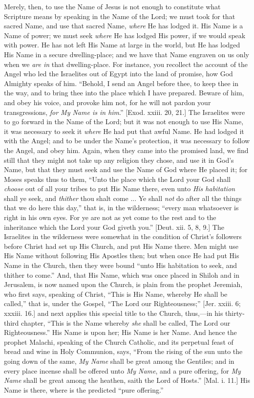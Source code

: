 Merely, then, to use the Name of Jesus is not enough to constitute
what Scripture means by speaking in the Name of the Lord; we must took
for that sacred Name, and use that sacred Name, \emph{where} He has
lodged it. His Name is a Name of power; we must seek \emph{where} He
has lodged His power, if we would speak with power. He has not left
His Name at large in the world, but He has lodged His Name in a secure
dwelling-place; and we have that Name engraven on us only when we \emph{are
in} that dwelling-place. For instance, you recollect the account of
the Angel who led the Israelites out of Egypt into the land of
promise, how God Almighty speaks of him. ``Behold, I send an Angel
before thee, to keep thee in the way, and to bring thee into the place
which I have prepared. Beware of him, and obey his voice, and provoke
him not, for he will not pardon your transgressions, \emph{for My Name is in
him}.'' [Exod. xxiii. 20, 21.] The Israelites were to go forward in
the Name of the Lord; but it was not enough to use His Name, it was
necessary to seek it \emph{where} He had put that awful Name. He had
lodged it with the Angel; and to be under the Name's protection, it
was necessary to follow the Angel, and obey him. Again, when they came
into the promised land, we find still that they might not take up any
religion they chose, and use it in God's Name, but that they must seek
and use the Name of God where He placed it; for Moses speaks thus to
them, ``Unto the place which the Lord your God shall \emph{choose}
out of all your tribes to put His Name there, even unto \emph{His
habitation} shall ye seek, and \emph{thither} thou shalt come ...
Ye shall \emph{not} do after all the things that we do here this
day,'' that is, in the wilderness; ``every man whatsoever is
right in his own eyes. For ye are not as yet come to the rest and to
the inheritance which the Lord your God giveth you.'' [Deut. xii.
5, 8, 9.] The Israelites in the wilderness were somewhat in the
condition of Christ's followers before Christ had set up His Church,
and put His Name there. Men might use His Name without following His
Apostles then; but when once He had put His Name in the Church, then
they were bound ``unto His habitation to seek, and thither to
come.'' And, that His Name, which was once placed in Shiloh and in
Jerusalem, is now named upon the Church, is plain from the prophet
Jeremiah, who first says, speaking of Christ, ``This is His Name,
whereby He shall be called,'' that is, under the Gospel, ``The
Lord our Righteousness;'' [Jer. xxiii. 6; xxxiii. 16.] and next
applies this special title to the Church, thus,—in his thirty-third
chapter, ``This is the Name whereby \emph{she} shall be called,
The Lord our Righteousness.'' His Name is upon her; His Name is
her Name. And hence the prophet Malachi, speaking of the Church
Catholic, and its perpetual feast of bread and wine in Holy Communion,
says, ``From the rising of the sun unto the going down of the
same, \emph{My Name} shall be great among the Gentiles; and in every
place incense shall be offered unto \emph{My Name}, and a pure
offering, for \emph{My Name} shall be great among the heathen, saith
the Lord of Hosts.'' [Mal. i. 11.] His Name is there, where is the
predicted ``pure offering.''

